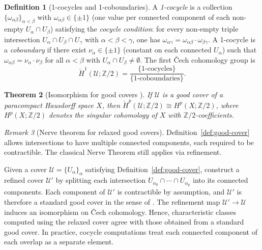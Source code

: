 \documentclass[11pt]{article}
\newcommand{\Z}{\mathbb{Z}}
\theoremstyle{plain}
\newtheorem{theorem}{Theorem}[section]
\theoremstyle{definition}
\newtheorem{definition}[theorem]{Definition}
\theoremstyle{remark}
\newtheorem{remark}[theorem]{Remark}
\begin{document}
\begin{definition}[1-cocycles and 1-coboundaries]\label{def:Z2-cocycles}
A \emph{1-cocycle} is a collection $\{\omega_{\alpha\beta}\}_{\alpha<\beta}$ with $\omega_{\alpha\beta}\in\{\pm 1\}$ (one value per connected component of each non-empty $U_\alpha\cap U_\beta$) satisfying the \emph{cocycle condition}: for every non-empty triple intersection $U_\alpha\cap U_\beta\cap U_\gamma$ with $\alpha<\beta<\gamma$, one has $\omega_{\alpha\gamma}=\omega_{\alpha\beta}\cdot\omega_{\beta\gamma}$.
A 1-cocycle is a \emph{coboundary} if there exist $\nu_\alpha\in\{\pm 1\}$ (constant on each connected $U_\alpha$) such that $\omega_{\alpha\beta}=\nu_\alpha\cdot\nu_\beta$ for all $\alpha<\beta$ with $U_\alpha\cap U_\beta\neq\emptyset$. The first \v{C}ech cohomology group is
\[
\check{H}^1(\mathcal{U};\Z/2)=\frac{\{1\text{-cocycles}\}}{\{1\text{-coboundaries}\}}.
\]
\end{definition}
 
\begin{theorem}[Isomorphism for good covers {\cite[Theorem 8.9]{BottTu}}]\label{thm:good-cover}
If $\mathcal{U}$ is a good cover of a paracompact Hausdorff space $X$, then
$\check{H}^p(\mathcal{U};\Z/2)\cong H^p(X;\Z/2)$,
where $H^p(X;\Z/2)$ denotes the singular cohomology of $X$ with $\Z/2$-coefficients.
\end{theorem}

\begin{remark}[Nerve theorem for relaxed good covers]
\label{rem:relaxed-nerve}
Definition~\ref{def:good-cover} allows intersections to have multiple connected components, each required to be contractible. The classical Nerve Theorem still applies via refinement.
 
Given a cover $\mathcal{U} = \{U_\alpha\}_{\alpha}$ satisfying Definition~\ref{def:good-cover}, construct a refined cover $\mathcal{U}'$ by splitting each intersection $U_{\alpha_0}\cap\cdots\cap U_{\alpha_p}$ into its connected components. Each component of $\mathcal{U}'$ is contractible by assumption, and $\mathcal{U}'$ is therefore a standard good cover in the sense of \cite[Sec.~II.15]{BottTu}.
The refinement map $\mathcal{U}' \to \mathcal{U}$ induces an isomorphism on \v{C}ech cohomology. Hence, characteristic classes computed using the relaxed cover agree with those obtained from a standard good cover. In practice, cocycle computations treat each connected component of each overlap as a separate element.
\end{remark}
 
\end{document}
